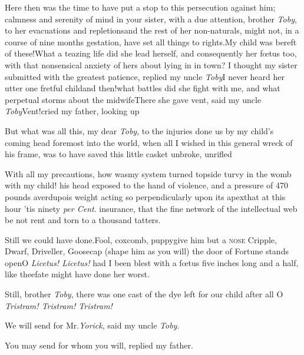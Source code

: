 \documentclass{article}
\begin{document}
Here then was the time to have put a stop to this
persecution against him;\tsh 
{}
calmness and serenity of mind in your
sister, with a due attention, brother \textit{Toby}, to her
evacuations and repletions\tsk and the rest of her
non-naturals, might not,\break 
in a course of nine months gestation,\break
have set all things to rights.\tsk My child was
bereft of these!\tsk What a teazing life did she lead
herself, and consequently her fœtus too, with that
nonsensical\break
anxiety of hers about lying in in town?\break
I thought my sister submitted with the greatest patience,
replied my uncle \textit{Toby}\break\tsk I never heard her
utter one fretful
child\tsk and then!\@ what battles did she
fight with me, and what perpetual storms
about the midwife\tsk There she gave vent, said my uncle
\textit{Toby}\tsk Vent!\@ cried my father, looking up\tsk

But what was all this, my dear \textit{Toby},\break
to the injuries done us by my child’s\break
coming head foremost into the world,\break
when all I wished in this general wreck\break
of his frame, was to have saved this\break
little casket unbroke, unrifled\tsk

With all my precautions, how was\break my system turned
topside turvy in the womb with my child! his head exposed to
the hand of violence, and a pressure of 470 pounds
averdupois weight acting so perpendicularly upon its
apex\tsk that at this hour ’tis ninety \textit{per Cent}.
insurance, that the fine network of the intellectual web be
not rent and torn to a thousand\break
tatters.

\tsk Still we could have done.\tsh Fool,\break 
coxcomb, puppy\tsk give him but a \textsc{nose}\break
\tsh Cripple, Dwarf, Driveller, Goosecap\break
\tsh (shape him as you will) the door of Fortune stands
open\tsk O \textit{Licetus! Licetus!} had I been blest with
a fœtus five inches long and a half, like thee\tsk fate
might have done her worst.

Still, brother \textit{Toby}, there was one cast of the dye
left for our child after all\tsk\break
O \textit{Tristram! Tristram!  Tristram!}

We will send for Mr.\@ \textit{Yorick}, said my uncle \textit{Toby}.

\tsh You may send for whom you will, replied my father.
\end{document}
